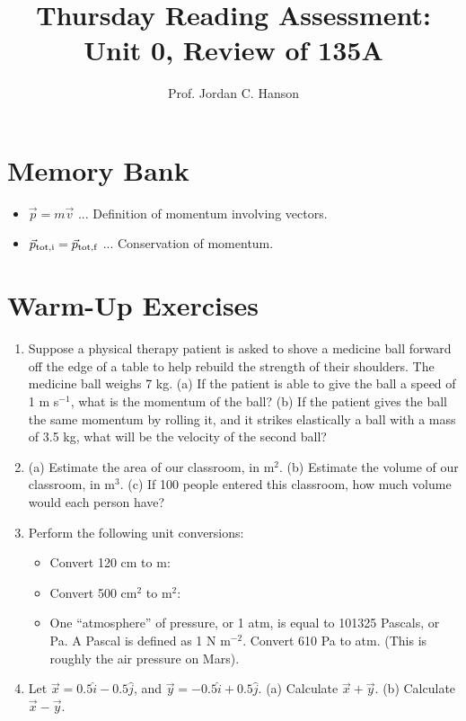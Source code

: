 \documentclass{article}
\begin{document}
\title{Thursday Reading Assessment: Unit 0, Review of 135A}
\author{Prof. Jordan C. Hanson}

\maketitle

\section{Memory Bank}

\begin{itemize}
\item $\vec{p} = m\vec{v}$ ... Definition of momentum involving vectors.
\item $\vec{p}_{\rm tot,i} = \vec{p}_{\rm tot,f}$ ... Conservation of momentum.
\end{itemize}

\section{Warm-Up Exercises}

\begin{enumerate}
\item Suppose a physical therapy patient is asked to shove a medicine ball forward off the edge of a table to help rebuild the strength of their shoulders.  The medicine ball weighs 7 kg.  (a) If the patient is able to give the ball a speed of 1 m s$^{-1}$, what is the momentum of the ball? (b) If the patient gives the ball the same momentum by rolling it, and it strikes elastically a ball with a mass of 3.5 kg, what will be the velocity of the second ball? \\ \vspace{1.5cm}
\item (a) Estimate the area of our classroom, in m$^2$. (b) Estimate the volume of our classroom, in m$^3$.  (c) If 100 people entered this classroom, how much volume would each person have? \\ \vspace{1.5cm}
\item Perform the following unit conversions:
\begin{itemize}
\item Convert 120 cm to m:
\item Convert 500 cm$^2$ to m$^2$:
\item One ``atmosphere'' of pressure, or 1 atm, is equal to 101325 Pascals, or Pa.  A Pascal is defined as 1 N m$^{-2}$.  Convert 610 Pa to atm. (This is roughly the air pressure on Mars). \\ \vspace{1cm}
\end{itemize}
\item Let $\vec{x} = 0.5 \hat{i} - 0.5\hat{j}$, and $\vec{y} = -0.5\hat{i} + 0.5\hat{j}$. (a) Calculate $\vec{x} + \vec{y}$.  (b) Calculate $\vec{x} - \vec{y}$.
\end{enumerate}
\end{document}

